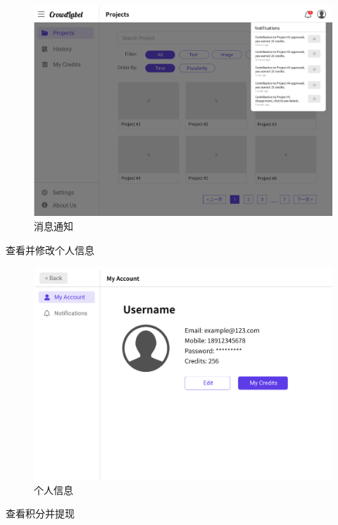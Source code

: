 \begin{figure}[h!]
    \centering
    \includegraphics[width=\linewidth]{imgs/prototype/notifs.png}
    \caption{消息通知}
\end{figure}

\newpage

查看并修改个人信息

\begin{figure}[h!]
    \centering
    \includegraphics[width=\linewidth]{imgs/prototype/myaccount.png}
    \caption{个人信息}
\end{figure}

\newpage

查看积分并提现

